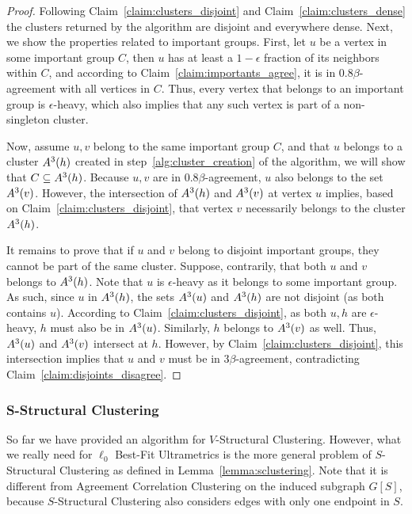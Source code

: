 \documentclass{article}
\begin{document}
\begin{proof}

Following Claim~\ref{claim:clusters_disjoint} and Claim~\ref{claim:clusters_dense} the clusters returned by the algorithm are disjoint and everywhere dense. Next, we show the properties related to important groups. First, let $u$ be a vertex in some important group $C$, then $u$ has at least a $1-\epsilon$ fraction of its neighbors within $C$, and according to Claim~\ref{claim:importants_agree}, it is in $0.8\beta$-agreement with all vertices in $C$. Thus, every vertex that belongs to an important group is $\epsilon$-heavy, which also implies that any such vertex is part of a non-singleton cluster. 

Now, assume $u, v$ belong to the same important group $C$, and that $u$ belongs to a cluster $A^3(h)$ created in step~\ref{alg:cluster_creation} of the algorithm, we will show that $C \subseteq A^3(h)$.
Because $u, v$ are in $0.8\beta$-agreement, $u$ also belongs to the set $A^3(v)$. However, the intersection of $A^3(h)$ and $A^3(v)$ at vertex $u$ implies, based on Claim~\ref{claim:clusters_disjoint}, that vertex $v$ necessarily belongs to the cluster $A^3(h)$.

It remains to prove that if $u$ and $v$ belong to disjoint important groups, they cannot be part of the same cluster. Suppose, contrarily, that both $u$ and $v$ belongs to $A^3(h)$. Note that $u$ is $\epsilon$-heavy as it belongs to some important group. As such, since $u$ in $A^3(h)$, the sets $A^3(u)$ and $A^3(h)$ are not disjoint (as both contains $u$). According to Claim~\ref{claim:clusters_disjoint}, as both $u,h$ are $\epsilon$-heavy, $h$ must also be in $A^3(u)$. Similarly, $h$ belongs to $A^3(v)$ as well. Thus, $A^3(u)$ and $A^3(v)$ intersect at $h$. However, by Claim~\ref{claim:clusters_disjoint}, this intersection implies that $u$ and $v$ must be in $3\beta$-agreement, contradicting Claim~\ref{claim:disjoints_disagree}.
\end{proof}


\subsubsection{S-Structural Clustering}
\label{sec:Sstructure}

So far we have provided an algorithm for $V$-Structural Clustering. However, what we really need for $\ell_0$ Best-Fit Ultrametrics is the more general problem of $S$-Structural Clustering as defined in Lemma~\ref{lemma:sclustering}. Note that it is different from Agreement Correlation Clustering on the induced subgraph $G[S]$, because $S$-Structural Clustering also considers edges with only one endpoint in $S$.
\end{document}
